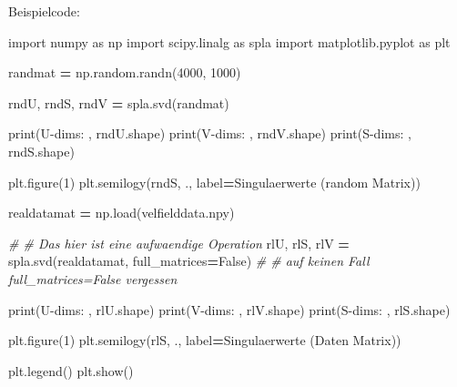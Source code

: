 \documentclass[
]{book}
\newenvironment{Shaded}{\begin{snugshade}}{\end{snugshade}}
\newcommand{\BuiltInTok}[1]{#1}
\newcommand{\CommentTok}[1]{\textcolor[rgb]{0.56,0.35,0.01}{\textit{#1}}}
\newcommand{\DecValTok}[1]{\textcolor[rgb]{0.00,0.00,0.81}{#1}}
\newcommand{\ImportTok}[1]{#1}
\newcommand{\NormalTok}[1]{#1}
\newcommand{\OperatorTok}[1]{\textcolor[rgb]{0.81,0.36,0.00}{\textbf{#1}}}
\newcommand{\StringTok}[1]{\textcolor[rgb]{0.31,0.60,0.02}{#1}}
\newcommand{\VariableTok}[1]{\textcolor[rgb]{0.00,0.00,0.00}{#1}}
\theoremstyle{definition}
\theoremstyle{definition}
\theoremstyle{definition}
\theoremstyle{definition}
\theoremstyle{remark}
\begin{document}
Beispielcode:

\begin{Shaded}
\begin{Highlighting}[]
\ImportTok{import}\NormalTok{ numpy }\ImportTok{as}\NormalTok{ np}
\ImportTok{import}\NormalTok{ scipy.linalg }\ImportTok{as}\NormalTok{ spla}
\ImportTok{import}\NormalTok{ matplotlib.pyplot }\ImportTok{as}\NormalTok{ plt}

\NormalTok{randmat }\OperatorTok{=}\NormalTok{ np.random.randn(}\DecValTok{4000}\NormalTok{, }\DecValTok{1000}\NormalTok{)}

\NormalTok{rndU, rndS, rndV }\OperatorTok{=}\NormalTok{ spla.svd(randmat)}

\BuiltInTok{print}\NormalTok{(}\StringTok{\textquotesingle{}U{-}dims: \textquotesingle{}}\NormalTok{, rndU.shape)}
\BuiltInTok{print}\NormalTok{(}\StringTok{\textquotesingle{}V{-}dims: \textquotesingle{}}\NormalTok{, rndV.shape)}
\BuiltInTok{print}\NormalTok{(}\StringTok{\textquotesingle{}S{-}dims: \textquotesingle{}}\NormalTok{, rndS.shape)}

\NormalTok{plt.figure(}\DecValTok{1}\NormalTok{)}
\NormalTok{plt.semilogy(rndS, }\StringTok{\textquotesingle{}.\textquotesingle{}}\NormalTok{, label}\OperatorTok{=}\StringTok{\textquotesingle{}Singulaerwerte (random Matrix)\textquotesingle{}}\NormalTok{)}

\NormalTok{realdatamat }\OperatorTok{=}\NormalTok{ np.load(}\StringTok{\textquotesingle{}velfielddata.npy\textquotesingle{}}\NormalTok{)}

\CommentTok{\# \# Das hier ist eine aufwaendige Operation}
\NormalTok{rlU, rlS, rlV }\OperatorTok{=}\NormalTok{ spla.svd(realdatamat, full\_matrices}\OperatorTok{=}\VariableTok{False}\NormalTok{)}
\CommentTok{\# \# auf keinen Fall \textasciigrave{}full\_matrices=False\textasciigrave{} vergessen}

\BuiltInTok{print}\NormalTok{(}\StringTok{\textquotesingle{}U{-}dims: \textquotesingle{}}\NormalTok{, rlU.shape)}
\BuiltInTok{print}\NormalTok{(}\StringTok{\textquotesingle{}V{-}dims: \textquotesingle{}}\NormalTok{, rlV.shape)}
\BuiltInTok{print}\NormalTok{(}\StringTok{\textquotesingle{}S{-}dims: \textquotesingle{}}\NormalTok{, rlS.shape)}

\NormalTok{plt.figure(}\DecValTok{1}\NormalTok{)}
\NormalTok{plt.semilogy(rlS, }\StringTok{\textquotesingle{}.\textquotesingle{}}\NormalTok{, label}\OperatorTok{=}\StringTok{\textquotesingle{}Singulaerwerte (Daten Matrix)\textquotesingle{}}\NormalTok{)}

\NormalTok{plt.legend()}
\NormalTok{plt.show()}
\end{Highlighting}
\end{Shaded}
\end{document}
